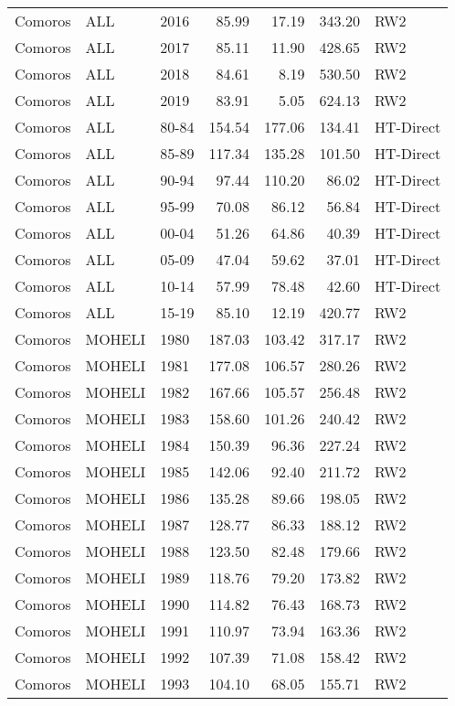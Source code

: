 \begin{longtable}{lllrrrl}
  Comoros & ALL & 2016 & 85.99 & 17.19 & 343.20 & RW2 \\ 
  Comoros & ALL & 2017 & 85.11 & 11.90 & 428.65 & RW2 \\ 
  Comoros & ALL & 2018 & 84.61 & 8.19 & 530.50 & RW2 \\ 
  Comoros & ALL & 2019 & 83.91 & 5.05 & 624.13 & RW2 \\ 
  Comoros & ALL & 80-84 & 154.54 & 177.06 & 134.41 & HT-Direct \\ 
  Comoros & ALL & 85-89 & 117.34 & 135.28 & 101.50 & HT-Direct \\ 
  Comoros & ALL & 90-94 & 97.44 & 110.20 & 86.02 & HT-Direct \\ 
  Comoros & ALL & 95-99 & 70.08 & 86.12 & 56.84 & HT-Direct \\ 
  Comoros & ALL & 00-04 & 51.26 & 64.86 & 40.39 & HT-Direct \\ 
  Comoros & ALL & 05-09 & 47.04 & 59.62 & 37.01 & HT-Direct \\ 
  Comoros & ALL & 10-14 & 57.99 & 78.48 & 42.60 & HT-Direct \\ 
  Comoros & ALL & 15-19 & 85.10 & 12.19 & 420.77 & RW2 \\ 
  Comoros & MOHELI & 1980 & 187.03 & 103.42 & 317.17 & RW2 \\ 
  Comoros & MOHELI & 1981 & 177.08 & 106.57 & 280.26 & RW2 \\ 
  Comoros & MOHELI & 1982 & 167.66 & 105.57 & 256.48 & RW2 \\ 
  Comoros & MOHELI & 1983 & 158.60 & 101.26 & 240.42 & RW2 \\ 
  Comoros & MOHELI & 1984 & 150.39 & 96.36 & 227.24 & RW2 \\ 
  Comoros & MOHELI & 1985 & 142.06 & 92.40 & 211.72 & RW2 \\ 
  Comoros & MOHELI & 1986 & 135.28 & 89.66 & 198.05 & RW2 \\ 
  Comoros & MOHELI & 1987 & 128.77 & 86.33 & 188.12 & RW2 \\ 
  Comoros & MOHELI & 1988 & 123.50 & 82.48 & 179.66 & RW2 \\ 
  Comoros & MOHELI & 1989 & 118.76 & 79.20 & 173.82 & RW2 \\ 
  Comoros & MOHELI & 1990 & 114.82 & 76.43 & 168.73 & RW2 \\ 
  Comoros & MOHELI & 1991 & 110.97 & 73.94 & 163.36 & RW2 \\ 
  Comoros & MOHELI & 1992 & 107.39 & 71.08 & 158.42 & RW2 \\ 
  Comoros & MOHELI & 1993 & 104.10 & 68.05 & 155.71 & RW2 \\ 

\end{longtable}

